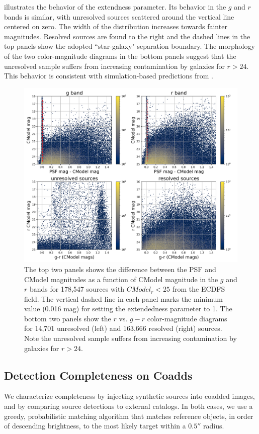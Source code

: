  illustrates the behavior of the extendness parameter. 
Its behavior in the $g$ and $r$ bands is similar, with unresolved sources scattered around the vertical line centered on zero. 
The width of the distribution increases towards fainter magnitudes.
Resolved sources are found to the right and the dashed lines in the top panels show the adopted ``star-galaxy" separation boundary.
The morphology of the two color-magnitude diagrams in the bottom panels suggest that the unresolved sample suffers from increasing contamination by galaxies for $r>24$. 
This behavior is consistent with simulation-based predictions from \cite{2020AJ....159...65S}.
\begin{figure}[t]
\includegraphics[width=\linewidth]{SG_DP1_ECDFS}
\caption{The top two panels shows the difference between the PSF and CModel magnitudes as a function of CModel magnitude in the
$g$ and $r$ bands for 178,547 sources with $CModel_r < 25$ from the ECDFS field. The vertical dashed line in each panel
marks the minimum value (0.016 mag) for setting the extendedness parameter to 1. The bottom two panels show the $r$ vs.
$g-r$ color-magnitude diagrams for 14,701 unresolved (left) and 163,666 resolved (right) sources. Note the unresolved sample
suffers from increasing contamination by galaxies for $r>24$.}
\label{fig:extendedness}
\end{figure}

\subsection{Detection Completeness on Coadds}
\label{ssec:detection_completeness}
We characterize completeness by injecting synthetic sources into coadded images, and by comparing source detections to external catalogs.
In both cases, we use a greedy, probabilistic matching \gls{algorithm} that matches reference objects, in order of descending brightness, to the most likely target within a $0.5''$ radius.

